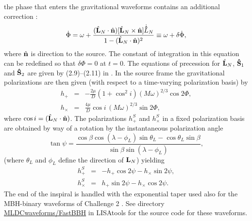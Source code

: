 \documentclass{iopart}
\def\bL{{\hat{\bf L}_{N}}}
\def\hn{{\hat{\bf n}}}
\begin{document}
the phase that enters the gravitational waveforms contains an additional correction \cite{ACST}:
%
\begin{equation}
\dot{\Phi} = \omega + \frac{(\bL\cdot\hn)[\bL\times \hn]\dot{\bf \hat{L}}_N}{1-(\bL\cdot\hn)^2}
\equiv \omega + \delta\dot{\Phi},\label{totPhi}
\end{equation}
%
where $\hn$ is direction to the source.
The constant of integration in this equation can be redefined so that $\delta\Phi = 0$ at $t=0$.  The equations of precession for $\bL$, ${\bf \hat{S}}_1$ and ${\bf \hat{S}}_2$ are given by (2.9)--(2.11) in 
 \cite{LangHughes}. In the source frame the gravitational polarizations are then given (with respect to a time-varying polarization basis) by
%
\begin{eqnarray}
h_{+} &=& -\frac{2\mu}{D}(1 + \cos^2 i)(M\omega)^{2/3}\cos{2\Phi}, \nonumber \\
h_{\times} &=& \frac{4\mu}{D}\cos i \,(M\omega)^{2/3}\sin{2\Phi},
\label{eq:polmbh}
\end{eqnarray}
%
where $\cos{i} = (\bL \cdot \hn)$.
The polarizations $h^S_+$ and $h^S_\times$ in a fixed polarization basis are obtained by way of a rotation by the instantaneous polarization angle
%
\begin{equation}
\tan{\psi} = \frac{\cos{\beta}\cos{(\lambda -\phi_L)}\sin{\theta_L} - \cos{\theta_L}\sin{\beta}}
{\sin{\beta}\sin{(\lambda - \phi_L)}},
\end{equation}
%
(where $\theta_L$ and $\phi_L$ define the direction of ${\bf L}_N$) yielding
%
\begin{eqnarray}
h_{+}^S &=& -h_{+}\cos{2\psi} - h_{\times}\sin{2\psi},\\
h_{\times}^S &=& h_{+}\sin{2\psi} - h_{\times}\cos{2\psi}.
\end{eqnarray}
%
The end of the inspiral is handled with the exponential taper used also for the MBH-binary waveforms of Challenge 2 \cite{mldcgwdaw2}.
See directory \url{MLDCwaveforms/FastBBH} in LISAtools for the source code for these waveforms.
\end{document}
